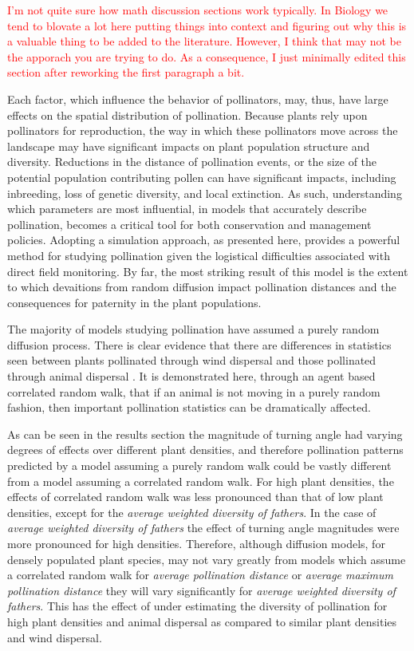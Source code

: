 \textcolor{red}{I'm not quite sure how math discussion sections work typically.
In Biology we tend to blovate a lot here putting things into context and
figuring out why this is a valuable thing to be added to the literature.
However, I think that may not be the apporach you are trying to do.  As a
consequence, I just minimally edited this section after reworking the first
paragraph a bit. }

Each factor, which influence the behavior of pollinators, may, thus, have large
effects on the spatial distribution of pollination. Because plants rely upon
pollinators for reproduction, the way in which these pollinators move across the
landscape may have significant impacts on plant population structure and
diversity. Reductions in the distance of pollination events, or the size of the
potential population contributing pollen can have significant impacts, including
inbreeding, loss of genetic diversity, and local extinction.  As such,
understanding which parameters are most influential, in models that accurately
describe pollination, becomes a critical tool for both conservation and
management policies.  Adopting a simulation approach, as presented here,
provides a powerful method for studying pollination given the logistical
difficulties associated with direct field monitoring.  By far, the most striking
result of this model is the extent to which devaitions from random diffusion
impact pollination distances and the consequences for paternity in the plant
populations.

The majority of models studying pollination have assumed a purely random
diffusion process. There is clear evidence that there are differences in
statistics seen between plants pollinated through wind dispersal and those
pollinated through animal dispersal \cite{LevinKerster}.  It is demonstrated
here, through an agent based correlated random walk, that if an animal is not
moving in a purely random fashion, then important pollination statistics can be
dramatically affected.

As can be seen in the results section the magnitude of turning angle had varying
degrees of effects over different plant densities, and therefore pollination
patterns predicted by a model assuming a purely random walk could be vastly
different from a model assuming a correlated random walk. For high plant
densities, the effects of correlated random walk was less pronounced than that
of low plant densities, except for the \emph{average weighted diversity of
fathers}. In the case of \emph{average weighted diversity of fathers} the effect
of turning angle magnitudes were more pronounced for high densities. Therefore,
although diffusion models, for densely populated plant species, may not vary
greatly from models which assume a correlated random walk for \emph{average
pollination distance} or \emph{average maximum pollination distance} they will
vary significantly for \emph{average weighted diversity of fathers}. This has
the effect of under estimating the diversity of pollination for high plant
densities and animal dispersal as compared to similar plant densities and wind
dispersal.

